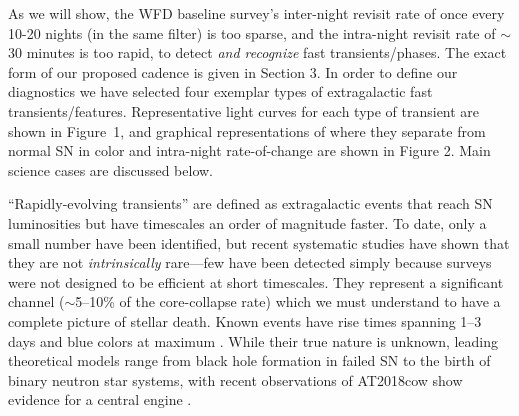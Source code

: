 \documentclass[12pt, letterpaper]{article}
\begin{document}

As we will show, the WFD baseline survey's inter-night revisit rate of once every 10-20 nights (in the same filter) is too sparse, and the intra-night revisit rate of $\sim$30 minutes is too rapid, to detect \emph{and recognize} fast transients/phases. The exact form of our proposed cadence is given in Section 3. In order to define our diagnostics we have selected four exemplar types of extragalactic fast transients/features. Representative light curves for each type of transient are shown in Figure~1, and graphical representations of where they separate from normal SN in color and intra-night rate-of-change are shown in Figure 2. Main science cases are discussed below.
\smallskip



 ``Rapidly-evolving transients'' are defined as extragalactic events that reach SN luminosities but have timescales an order of magnitude faster. To date, only a small number have been identified, but recent systematic studies \citep{Drout2014} have shown that they are not \emph{intrinsically} rare---few have been detected simply because surveys were not designed to be efficient at short timescales. They represent a significant channel ($\sim$5--10\% of the core-collapse rate) which we must understand to have a complete picture of stellar death. Known events have rise times spanning 1--3 days and blue colors at maximum \citep{Drout2014,Pirsiainen2018,Rest2018}. While their true nature is unknown, leading theoretical models range from black hole formation in failed SN to the birth of binary neutron star systems, with recent observations of AT2018cow show evidence for a central engine \citep{Kashiyama2015,Prentice2018,Margutti2018}. %


\end{document}

